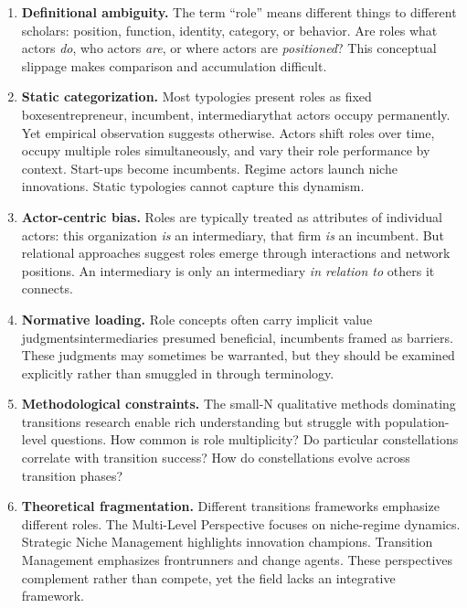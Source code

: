 \documentclass[../main.tex]{subfiles}
\begin{document}
\begin{enumerate}[leftmargin=*, itemsep=0.5em]

\item \textbf{Definitional ambiguity.} The term ``role'' means different things to different scholars: position, function, identity, category, or behavior. Are roles what actors \emph{do}, who actors \emph{are}, or where actors are \emph{positioned}? This conceptual slippage makes comparison and accumulation difficult.

\item \textbf{Static categorization.} Most typologies present roles as fixed boxes\textemdash entrepreneur, incumbent, intermediary\textemdash that actors occupy permanently. Yet empirical observation suggests otherwise. Actors shift roles over time, occupy multiple roles simultaneously, and vary their role performance by context. Start-ups become incumbents. Regime actors launch niche innovations. Static typologies cannot capture this dynamism.

\item \textbf{Actor-centric bias.} Roles are typically treated as attributes of individual actors: this organization \emph{is} an intermediary, that firm \emph{is} an incumbent. But relational approaches suggest roles emerge through interactions and network positions. An intermediary is only an intermediary \emph{in relation to} others it connects.

\item \textbf{Normative loading.} Role concepts often carry implicit value judgments\textemdash intermediaries presumed beneficial, incumbents framed as barriers. These judgments may sometimes be warranted, but they should be examined explicitly rather than smuggled in through terminology.

\item \textbf{Methodological constraints.} The small-N qualitative methods dominating transitions research enable rich understanding but struggle with population-level questions. How common is role multiplicity? Do particular constellations correlate with transition success? How do constellations evolve across transition phases?

\item \textbf{Theoretical fragmentation.} Different transitions frameworks emphasize different roles. The Multi-Level Perspective focuses on niche-regime dynamics. Strategic Niche Management highlights innovation champions. Transition Management emphasizes frontrunners and change agents. These perspectives complement rather than compete, yet the field lacks an integrative framework.


\end{enumerate}
\end{document}
